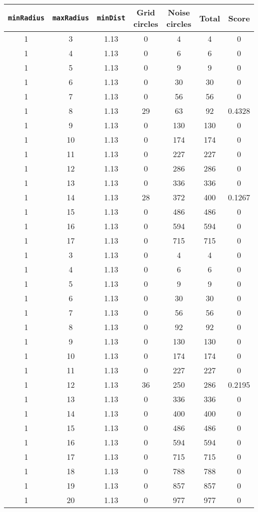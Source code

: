 \documentclass[letterpaper, 12pt]{article}
\begin{document}
\begin{longtable}{|c|c|c|c|c|c|c|}
\hline
\textbf{\texttt{minRadius}} & \textbf{\texttt{maxRadius}} & \textbf{\texttt{minDist}} & \textbf{Grid circles} & \textbf{Noise circles} & \textbf{Total} & \textbf{Score} \\
\hline
1 & 3 & 1.13 & 0 & 4 & 4 & 0 \\
\hline
1 & 4 & 1.13 & 0 & 6 & 6 & 0 \\
\hline
1 & 5 & 1.13 & 0 & 9 & 9 & 0 \\
\hline
1 & 6 & 1.13 & 0 & 30 & 30 & 0 \\
\hline
1 & 7 & 1.13 & 0 & 56 & 56 & 0 \\
\hline
1 & 8 & 1.13 & 29 & 63 & 92 & 0.4328 \\
\hline
1 & 9 & 1.13 & 0 & 130 & 130 & 0 \\
\hline
1 & 10 & 1.13 & 0 & 174 & 174 & 0 \\
\hline
1 & 11 & 1.13 & 0 & 227 & 227 & 0 \\
\hline
1 & 12 & 1.13 & 0 & 286 & 286 & 0 \\
\hline
1 & 13 & 1.13 & 0 & 336 & 336 & 0 \\
\hline
1 & 14 & 1.13 & 28 & 372 & 400 & 0.1267 \\
\hline
1 & 15 & 1.13 & 0 & 486 & 486 & 0 \\
\hline
1 & 16 & 1.13 & 0 & 594 & 594 & 0 \\
\hline
1 & 17 & 1.13 & 0 & 715 & 715 & 0 \\
\hline
1 & 3 & 1.13 & 0 & 4 & 4 & 0 \\
\hline
1 & 4 & 1.13 & 0 & 6 & 6 & 0 \\
\hline
1 & 5 & 1.13 & 0 & 9 & 9 & 0 \\
\hline
1 & 6 & 1.13 & 0 & 30 & 30 & 0 \\
\hline
1 & 7 & 1.13 & 0 & 56 & 56 & 0 \\
\hline
1 & 8 & 1.13 & 0 & 92 & 92 & 0 \\
\hline
1 & 9 & 1.13 & 0 & 130 & 130 & 0 \\
\hline
1 & 10 & 1.13 & 0 & 174 & 174 & 0 \\
\hline
1 & 11 & 1.13 & 0 & 227 & 227 & 0 \\
\hline
1 & 12 & 1.13 & 36 & 250 & 286 & 0.2195 \\
\hline
1 & 13 & 1.13 & 0 & 336 & 336 & 0 \\
\hline
1 & 14 & 1.13 & 0 & 400 & 400 & 0 \\
\hline
1 & 15 & 1.13 & 0 & 486 & 486 & 0 \\
\hline
1 & 16 & 1.13 & 0 & 594 & 594 & 0 \\
\hline
1 & 17 & 1.13 & 0 & 715 & 715 & 0 \\
\hline
1 & 18 & 1.13 & 0 & 788 & 788 & 0 \\
\hline
1 & 19 & 1.13 & 0 & 857 & 857 & 0 \\
\hline
1 & 20 & 1.13 & 0 & 977 & 977 & 0 \\
\hline
\end{longtable}
\end{document}
